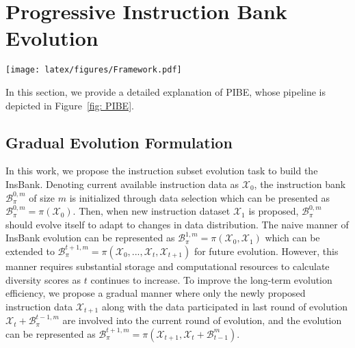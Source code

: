 \section{Progressive Instruction Bank Evolution}

\begin{figure*}[hbtp]
\begin{center}
\texttt{[image: latex/figures/Framework.pdf]}
\end{center}
\caption{The detailed pipeline of PIBE. It consists of four core elements: the gradual manner of evolution, the flow of historical information across evolution rounds, individual representation scoring for diversity evaluation, and the integration of quality and diversity scores for data selection and ranking}
\label{fig: PIBE}
\end{figure*}

In this section, we provide a detailed explanation of PIBE, whose pipeline is depicted in Figure~\ref{fig: PIBE}.

\subsection{Gradual Evolution Formulation}

In this work, we propose the instruction subset evolution task to build the InsBank. Denoting current available instruction data as $\mathcal{X}_0$, the instruction bank $\mathcal{B}_{\pi}^{0,m}$ of size $m$ is initialized through data selection which can be presented as $\mathcal{B}_{\pi}^{0,m} = \pi(\mathcal{X}_0)$. Then, when new instruction dataset $\mathcal{X}_1$ is proposed, $\mathcal{B}_{\pi}^{0,m}$ should evolve itself to adapt to changes in data distribution. The naive manner of InsBank evolution can be represented as $\mathcal{B}_{\pi}^{1,m} = \pi(\mathcal{X}_0, \mathcal{X}_1)$ which can be extended to $\mathcal{B}_{\pi}^{t+1,m} = \pi(\mathcal{X}_0, ..., \mathcal{X}_t, \mathcal{X}_{t+1})$ for future evolution. However, this manner requires substantial storage and computational resources to calculate diversity scores as $t$ continues to increase. To improve the long-term evolution efficiency, we propose a gradual manner where only the newly proposed instruction data $\mathcal{X}_{t+1}$ along with the data participated in last round of evolution $\mathcal{X}_t + \mathcal{B}_{\pi}^{t-1,m}$ are involved into the current round of evolution, and the evolution can be represented as $\mathcal{B}_{\pi}^{t+1,m} = \pi(\mathcal{X}_{t+1}, \mathcal{X}_t + \mathcal{B}_{t-1}^m)$.

